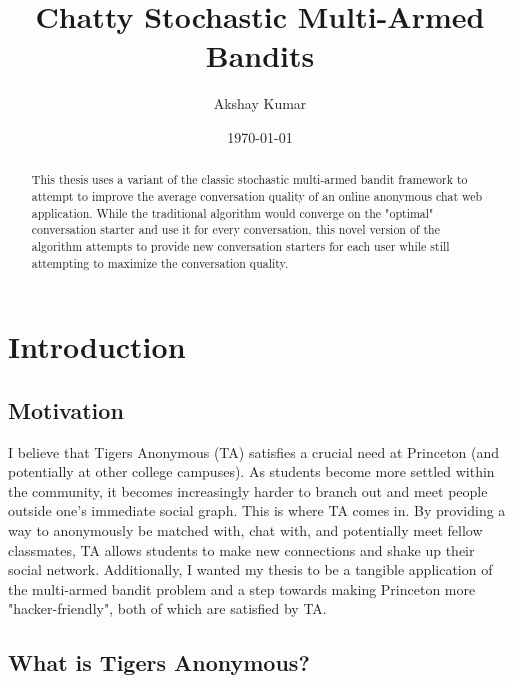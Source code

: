 \documentclass{article}
\begin{document}
\title{Chatty Stochastic Multi-Armed Bandits}
\author{Akshay Kumar}
\date{\today}
\maketitle

\begin{abstract}

This thesis uses a variant of the classic stochastic multi-armed bandit framework to attempt to improve the average conversation quality of an online anonymous chat web application. While the traditional algorithm would converge on the "optimal" conversation starter and use it for every conversation, this novel version of the algorithm attempts to provide new conversation starters for each user while still attempting to maximize the conversation quality.

\end{abstract}

\tableofcontents
\newpage

\section{Introduction}

\subsection{Motivation}

I believe that Tigers Anonymous (TA) satisfies a crucial need at Princeton (and potentially at other college campuses). As students become more settled within the community, it becomes increasingly harder to branch out and meet people outside one's immediate social graph. This is where TA comes in. By providing a way to anonymously be matched with, chat with, and potentially meet fellow classmates, TA allows students to make new connections and shake up their social network. Additionally, I wanted my thesis to be a tangible application of the multi-armed bandit problem and a step towards making Princeton more "hacker-friendly", both of which are satisfied by TA.

\subsection{What is Tigers Anonymous?}
\end{document}
